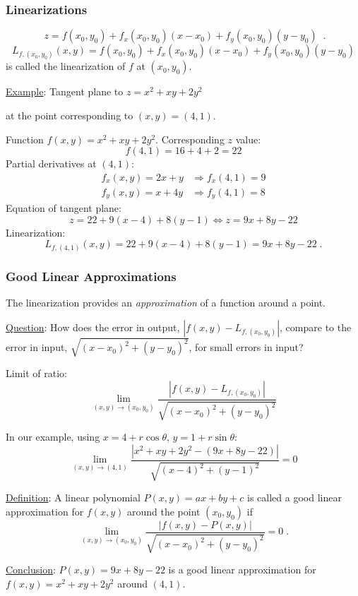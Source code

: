 \begin{frame}
  \frametitle{Linearizations}
$$\boxed{ \; z= f(x_0,y_0) + f_x(x_0,y_0) (x-x_0) + f_y(x_0,y_0)(y-y_0) \; }\; .$$
%
$$L_{f,(x_0,y_0)} (x,y) = f(x_0,y_0) + f_x(x_0,y_0) (x-x_0) + f_y(x_0,y_0)(y-y_0)$$
%
is called the \textcolor[rgb]{0.98,0.00,0.00}{linearization} of $f$ at $(x_0,y_0)$.

\pause
\underline{Example}: Tangent plane to $z=x^2+xy+2y^2$

at the point corresponding to $(x,y) = (4,1)$.

Function $f(x,y) = x^2+xy+2y^2$. \pause Corresponding $z$ value:
%
$$f(4,1) = 16+4+2 = 22$$
%
\pause Partial derivatives \textcolor[rgb]{0.98,0.00,0.00}{at $(4,1)$}:
%
\begin{align*}
  f_x(x,y) = 2x+y & \Longrightarrow f_x(4,1) = 9 \\
  f_y(x,y) = x+4y & \Longrightarrow f_y(4,1) = 8
\end{align*}
%
\pause Equation of tangent plane:
%
$$z = 22+ 9(x-4) + 8 (y-1) \Longleftrightarrow z = 9x+8y -22$$
%
\pause Linearization:
%
$$L_{f, (4,1)}(x,y) = 22+ 9(x-4) + 8 (y-1) = 9x+8y -22\; .$$
%
\end{frame}

\begin{frame}
  \frametitle{Good Linear Approximations}

The linearization provides an \emph{approximation} of a function around a point.

\underline{Question}: How does the error in output, $|f(x,y) - L_{f,(x_0,y_0)}|$, compare to the error in input, $\sqrt{(x-x_0)^2 + (y-y_0)^2}$, for small errors in input?

\pause Limit of ratio:
%
$$\lim_{(x,y) \to (x_0,y_0)} \frac{|f(x,y) - L_{f,(x_0,y_0)}|}{\sqrt{(x-x_0)^2 + (y-y_0)^2}}$$

\pause In our example, using $x=4+r\cos{\theta}$, $y=1+r\sin{\theta}$:
%
$$\lim_{(x,y) \to (4,1)} \frac{|x^2+xy+2y^2 - (9x+8y -22)|}{\sqrt{(x-4)^2+(y-1)^2}} = 0$$
%

\pause \underline{Definition}: A linear polynomial $P(x,y) = ax+by+c$ is called a \textcolor[rgb]{0.98,0.00,0.00}{good linear approximation} for $f(x,y)$ around the point $(x_0,y_0)$ if
%
$$\lim_{(x,y) \to (x_0,y_0)} \frac{|f(x,y) - P(x,y)|}{\sqrt{(x-x_0)^2 + (y-y_0)^2}} = 0\; .$$

\pause \underline{Conclusion}: $P(x,y) = 9x+8y-22$ is a good linear approximation for $f(x,y) = x^2+xy+2y^2$ around $(4,1)$.
\end{frame}



